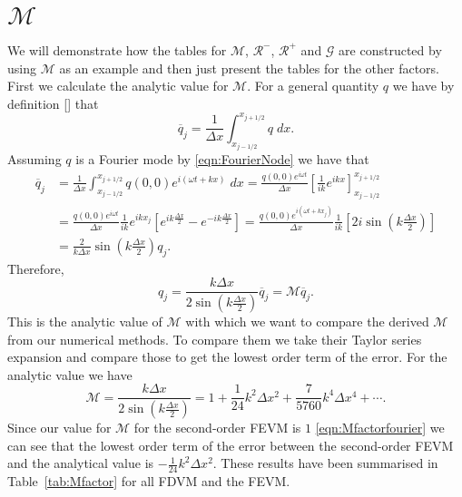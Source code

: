 \documentclass[12pt]{article}
\begin{document}
\section{$\mathcal{M}$} 
We will demonstrate how the tables for $\mathcal{M}$, $\mathcal{R}^-$, $\mathcal{R}^+$ and $\mathcal{G}$ are constructed by using $\mathcal{M}$ as an example and then just present the tables for the other factors. First we calculate the analytic value for $\mathcal{M}$. For a general quantity $q$ we have by definition [] that
\begin{equation*}
\overline{q}_j = \frac{1}{\Delta x} \int_{x_{j-1/2}}^{x_{j+1/2}} q \; dx.
\end{equation*}
Assuming $q$ is a Fourier mode by \eqref{eqn:FourierNode} we have that
\begin{align*}
\overline{q}_j &= \frac{1}{\Delta x} \int_{x_{j-1/2}}^{x_{j+1/2}} q(0,0) e^{i\left(\omega t + kx\right)} \; dx = \frac{q(0,0)e^{i \omega  t}}{\Delta x} \left[\frac{1}{ik} e^{ikx}\right]_{x_{j-1/2}}^{x_{j+1/2}} \\
&= \frac{q(0,0)e^{i \omega  t}}{\Delta x} \frac{1}{ik} e^{ikx_j} \left[ e^{ik\frac{\Delta x}{2}} - e^{-ik\frac{\Delta x}{2}}\right] = \frac{q(0,0)e^{i \left(\omega  t + kx_j \right)}}{\Delta x} \frac{1}{ik} \left[ 2 i \sin \left(k\frac{\Delta x}{2}\right)\right]\\
&=  \frac{2}{k\Delta x} \sin \left(k\frac{\Delta x}{2}\right) q_j.
\end{align*}
Therefore,
\begin{equation}
q_j =  \frac{k\Delta x}{2 \sin \left(k\frac{\Delta x}{2}\right)  } \overline{q}_j = \mathcal{M}  \overline{q}_j.
\end{equation}
This is the analytic value of $\mathcal{M}$ with which we want to compare the derived $\mathcal{M}$ from our numerical methods. To compare them we take their Taylor series expansion and compare those to get the lowest order term of the error. For the analytic value we have
\begin{equation}
\mathcal{M} = \frac{k\Delta x}{2 \sin \left(k\frac{\Delta x}{2}\right)  } = 1 + \frac{1}{24} k^2 \Delta x^2 + \frac{7}{5760}k^4\Delta x ^4 + \cdots.
\end{equation}
Since our value for $\mathcal{M}$ for the second-order FEVM is $1$ \eqref{eqn:Mfactorfourier} we can see that the lowest order term of the error between the second-order FEVM and the analytical value is $-\frac{1}{24} k^2 \Delta x^2$. These results have been summarised in Table~\ref{tab:Mfactor} for all FDVM and the FEVM. 
\end{document}
